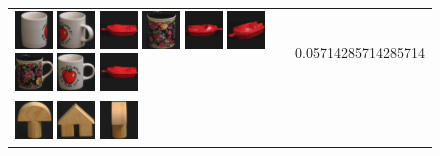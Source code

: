 \begin{figure}[tbp]
\begin{center}
\begin{tabular}{m{11cm} | m{3cm} |}
\includegraphics[width=1cm]{coil/beeld-38.eps}
\includegraphics[width=1cm]{coil/beeld-40.eps}
\includegraphics[width=1cm]{coil/beeld-18.eps}
\includegraphics[width=1cm]{coil/beeld-62.eps}
\includegraphics[width=1cm]{coil/beeld-19.eps}
\includegraphics[width=1cm]{coil/beeld-21.eps}
\includegraphics[width=1cm]{coil/beeld-60.eps}
\includegraphics[width=1cm]{coil/beeld-36.eps}
\includegraphics[width=1cm]{coil/beeld-18.eps}
& {\scriptsize 0.05714285714285714}
\\
\includegraphics[width=1cm]{coil/beeld-0.eps}
\includegraphics[width=1cm]{coil/beeld-42.eps}
\includegraphics[width=1cm]{coil/beeld-2.eps}

\end{tabular}
\end{center}
\end{figure}
